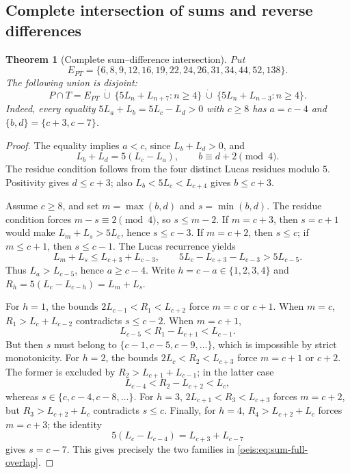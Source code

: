\documentclass[11pt]{article}
\newtheorem{theorem}{Theorem}[section]
\begin{document}
\subsection{Complete intersection of sums and reverse differences}
\begin{theorem}[Complete sum--difference intersection]\label{oeis:thm:sum-full-overlap}
Put
\[
E_{PT}=\{6,8,9,12,16,19,22,24,26,31,34,44,52,138\}.
\]
The following union is disjoint:
\begin{equation}\label{oeis:eq:sum-full-overlap}
\boxed{P\cap T=E_{PT}\ \dot\cup\
 \{5L_n+L_{n+7}:n\ge4\}\ \dot\cup\
 \{5L_n+L_{n-3}:n\ge4\}.}
\end{equation}
Indeed, every equality $5L_a+L_b=5L_c-L_d>0$
with $c\ge8$ has $a=c-4$ and
$\{b,d\}=\{c+3,c-7\}$.
\end{theorem}
\begin{proof}
The equality implies $a<c$, since $L_b+L_d>0$, and
\begin{equation}\label{oeis:eq:sum-overlap-condition}
L_b+L_d=5(L_c-L_a),\qquad b\equiv d+2\pmod4.
\end{equation}
The residue condition follows from the four distinct Lucas
residues modulo $5$. Positivity gives $d\le c+3$; also
$L_b<5L_c<L_{c+4}$ gives $b\le c+3$.

Assume $c\ge8$, and set $m=\max(b,d)$ and $s=\min(b,d)$.
The residue condition forces $m-s\equiv2\pmod4$,
so $s\le m-2$. If $m=c+3$, then $s=c+1$ would
make $L_m+L_s>5L_c$, hence $s\le c-3$.
If $m=c+2$, then $s\le c$; if $m\le c+1$, then
$s\le c-1$. The Lucas recurrence yields
\[
L_m+L_s\le L_{c+3}+L_{c-3},\qquad
5L_c-L_{c+3}-L_{c-3}>5L_{c-5}.
\]
Thus $L_a>L_{c-5}$, hence $a\ge c-4$.
Write $h=c-a\in\{1,2,3,4\}$ and
$R_h=5(L_c-L_{c-h})=L_m+L_s$.

For $h=1$, the bounds
$2L_{c-1}<R_1<L_{c+2}$ force $m=c$ or $c+1$.
When $m=c$, $R_1>L_c+L_{c-2}$ contradicts $s\le c-2$.
When $m=c+1$,
\[
L_{c-5}<R_1-L_{c+1}<L_{c-1}.
\]
But then $s$ must belong to $\{c-1,c-5,c-9,\ldots\}$,
which is impossible by strict monotonicity.
For $h=2$, the bounds $2L_c<R_2<L_{c+3}$
force $m=c+1$ or $c+2$. The former is excluded by
$R_2>L_{c+1}+L_{c-1}$; in the latter case
\[
L_{c-4}<R_2-L_{c+2}<L_c,
\]
whereas $s\in\{c,c-4,c-8,\ldots\}$.
For $h=3$, $2L_{c+1}<R_3<L_{c+3}$ forces
$m=c+2$, but $R_3>L_{c+2}+L_c$ contradicts $s\le c$.
Finally, for $h=4$, $R_4>L_{c+2}+L_c$ forces
$m=c+3$; the identity
\[
5(L_c-L_{c-4})=L_{c+3}+L_{c-7}
\]
gives $s=c-7$. This gives precisely the two families
in \eqref{oeis:eq:sum-full-overlap}.


\end{proof}
\end{document}
